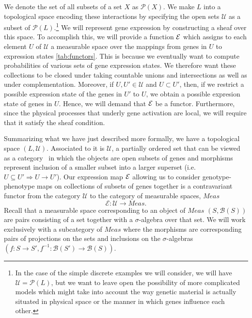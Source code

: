 We denote the set of all subsets of a set $X$ as $\mathcal{P}(X)$. We make $L$ into a topological space encoding these interactions by specifying the open sets $\mathcal{U}$ as a subset of $\mathcal{P}(L)$.\footnote{In the case of the simple discrete examples we will consider, we will have $\mathcal{U} = \mathcal{P}(L)$, but we want to leave open the possibility of more complicated models which might take into account the way genetic material is actually situated in physical space or the manner in which genes influence each other.} We will represent gene expression by constructing a sheaf over this space.  To accomplish this, we will provide a function $\mathcal{E}$ which assigns to each element $U$ of $\mathcal{U}$ a measurable space over the mappings from genes in $U$ to expression states \ref{tab:functors}.    This is because we eventually want to compute probabilities of various sets of gene expression states. We therefore want these collections to be closed under taking countable unions and intersections as well as under complementation.  Moreover, if $U, U' \in \mathcal{U}$ and $U \subset U'$, then, if we restrict a possible expression state of the genes in $U'$ to $U$, we obtain a possible expresion state of genes in $U$.  Hence, we will demand that $\mathcal{E}$ be a functor.  Furthermore, since the physical processes that underly gene activation are local, we will require that it satisfy the sheaf condition.

Summarizing what we have just described more formally, we have a topological space $(L,\mathcal{U})$. Associated to it is $\mathcal{U}$, a partially ordered set that can be viewed as a category~\cite{Lane1998,MacLane1992,Awodey2006} in which the objects are open subsets of genes and morphisms represent inclusion of a smaller subset into a larger superset (i.e. $U \subseteq U' \Rightarrow U \rightarrow U'$).
Our expression map $\mathcal{E}$ allowing us to consider genotype-phenotype maps on collections of subsets of genes together is a contravariant functor from the category $\mathcal{U}$ to the category of measurable spaces, $Meas$
$$
\mathcal{E} \colon \mathcal{U} \rightarrow Meas.
$$
Recall that a measurable space corresponding to an object of $Meas$ $(S,\mathcal{B}(S))$ are pairs consisting of a set together with a $\sigma$-algebra over that set. We will work exclusively with a subcategory of $Meas$ where the morphisms are corresponding pairs of projections on the sets and inclusions on the $\sigma$-algebras $(f:S \rightarrow S', f^{-1} : \mathcal{B}(S') \rightarrow \mathcal{B}(S))$.

